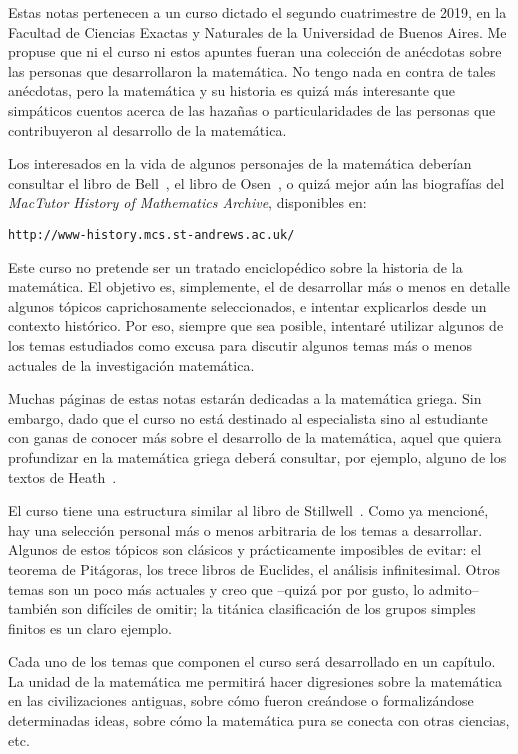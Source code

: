 \preface

Estas notas pertenecen a un curso dictado el segundo cuatrimestre de 2019, en
la Facultad de Ciencias Exactas y Naturales de la Universidad de Buenos Aires.
Me propuse que ni el curso ni estos apuntes fueran una colección
de anécdotas sobre las personas que desarrollaron la matemática. No tengo nada
en contra de tales anécdotas, pero la matemática y su historia es quizá 
más interesante que simpáticos cuentos acerca de las hazañas o particularidades
de las personas que contribuyeron al desarrollo de la matemática.

Los interesados en la vida de algunos personajes de la matemática deberían
consultar el libro de Bell~\cite{MR3728304}, el libro de Osen~\cite{MR0497806},
o quizá mejor aún las biografías del \emph{MacTutor History of Mathematics
Archive}, disponibles en:

\begin{center}
\verb+http://www-history.mcs.st-andrews.ac.uk/+
\end{center}

Este curso no pretende ser un tratado enciclopédico sobre la historia de la
matemática. El objetivo es, simplemente, el de desarrollar más o menos 
en detalle algunos tópicos  
caprichosamente seleccionados, e intentar explicarlos desde un contexto
histórico. Por eso, siempre que sea posible, intentaré utilizar algunos de los 
temas estudiados como excusa para discutir  
algunos temas más o menos actuales de la investigación matemática. 

Muchas páginas de estas notas estarán dedicadas a la matemática
griega. Sin embargo, dado que el curso no está destinado al especialista sino 
al estudiante con ganas de conocer más sobre el desarrollo de la matemática, 
aquel que quiera profundizar en la matemática griega 
deberá consultar, por ejemplo, alguno de los textos de Heath~\cite{MR654679,
MR654680,MR0156760}. 

El curso tiene una estructura similar al libro de
Stillwell~\cite{MR2667826}.  Como ya mencioné, hay una selección personal 
más o menos arbitraria
de los temas a desarrollar. Algunos de estos tópicos son clásicos y
prácticamente imposibles de evitar: el teorema de Pitágoras, los trece libros
de Euclides, el análisis infinitesimal. Otros
temas son un poco más actuales y creo que --quizá por por gusto, lo admito-- 
también son difíciles de omitir; la titánica 
clasificación de los grupos simples finitos
es un claro ejemplo.

Cada uno de los temas que componen el curso será desarrollado en un capítulo. 
La unidad de la matemática me permitirá hacer digresiones
sobre la matemática en las civilizaciones antiguas, sobre cómo fueron creándose
o formalizándose determinadas ideas, sobre cómo la matemática pura se conecta
con otras ciencias, etc. 

